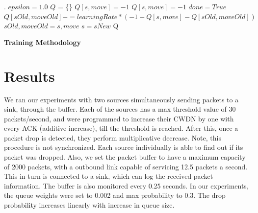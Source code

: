 \documentclass[conference, 10pt]{IEEEtran}
\begin{document}
\begin{algorithm}[]
  \begin{algorithmic}[1]
  .  
  \State $epsilon = 1.0$
  \State $Q$ = \{\}
                \State $Q[s,move] = -1$
            \EndIf
             
                \State $Q[s, move] = -1$
                \State $done = True$
            \EndIf
            \Else
                \State $Q[sOld,moveOld] += learningRate * (-1 + Q[s,move] - Q[sOld,moveOld])$
                \EndIf
                \State $sOld, moveOld = s, move$
                \State $s = sNew$
            \EndIf
        \EndFor
  \EndFor
  \State \Return Q
  \end{algorithmic}
  \caption{\textbf{Training Methodology}}
  \label{alg:2}
\end{algorithm}


\section{Results}
\label{sec:analysis}
We ran our experiments with two sources simultaneously sending packets to a sink, through the buffer. Each of the sources has a max threshold value of 30 packets/second, and were programmed to increase their CWDN by one with every ACK (additive increase), till the threshold is reached. After this, once a packet drop is detected, they perform multiplicative decrease. Note, this procedure is not synchronized. Each source individually is able to find out if its packet was dropped. Also, we set the packet buffer to have a maximum capacity of 2000 packets, with a outbound link capable of servicing 12.5 packets a second. This in turn is connected to a sink, which can log the received packet information. The buffer is also monitored every 0.25 seconds. In our experiments, the queue weights were set to 0.002 and max probability to 0.3. The drop probability increases linearly with increase in queue size.
\end{document}
